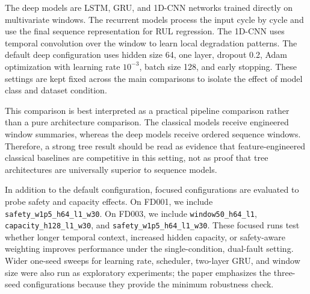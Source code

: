 \documentclass[11pt,a4paper]{article}
\begin{document}
The deep models are LSTM, GRU, and 1D-CNN networks trained directly on multivariate windows. The recurrent models process the input cycle by cycle and use the final sequence representation for RUL regression. The 1D-CNN uses temporal convolution over the window to learn local degradation patterns. The default deep configuration uses hidden size 64, one layer, dropout 0.2, Adam optimization with learning rate $10^{-3}$, batch size 128, and early stopping. These settings are kept fixed across the main comparisons to isolate the effect of model class and dataset condition.

This comparison is best interpreted as a practical pipeline comparison rather than a pure architecture comparison. The classical models receive engineered window summaries, whereas the deep models receive ordered sequence windows. Therefore, a strong tree result should be read as evidence that feature-engineered classical baselines are competitive in this setting, not as proof that tree architectures are universally superior to sequence models.

In addition to the default configuration, focused configurations are evaluated to probe safety and capacity effects. On FD001, we include \texttt{safety\_w1p5\_h64\_l1\_w30}. On FD003, we include \texttt{window50\_h64\_l1}, \texttt{capacity\_h128\_l1\_w30}, and \texttt{safety\_w1p5\_h64\_l1\_w30}. These focused runs test whether longer temporal context, increased hidden capacity, or safety-aware weighting improves performance under the single-condition, dual-fault setting. Wider one-seed sweeps for learning rate, scheduler, two-layer GRU, and window size were also run as exploratory experiments; the paper emphasizes the three-seed configurations because they provide the minimum robustness check.
\end{document}
